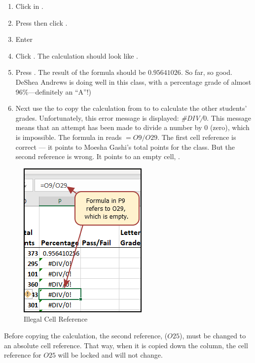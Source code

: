 \begin{enumbox}
	\begin{enumerate}
		\item Click in .
		\item Press \fmtTyping{=} then click . 
		\item Enter \fmtTyping{/}
		\item Click . The calculation should look like .
		\item Press . The result of the formula should be $ 0.95641026 $. So far, so good. DeShea Andrews is doing well in this class, with a percentage grade of almost 96\%---definitely an ``A''!)
		\item Next use the  to copy the calculation from  to  to calculate the other students' grades. Unfortunately, this error message is displayed: \textit{\#DIV/$ 0 $}. This message means that an attempt has been made to divide a number by $ 0 $ (zero), which is impossible. The formula in  reads $ =O9/O29 $. The first cell reference is correct --- it points to Moesha Gashi's total points for the class. But the second reference is wrong. It points to an empty cell, .
	\end{enumerate}
\end{enumbox}

\begin{figure}[H]
	\centering
	\includegraphics[width=\maxwidth{.50\linewidth}]{gfx/ch03_fig07a}
	\caption{Illegal Cell Reference}
	\label{03:fig07a}
\end{figure}

Before copying the calculation, the second reference, ($ O25 $), must be changed to an absolute cell reference. That way, when it is copied down the column, the cell reference for $ O25 $ will be locked and will not change.

